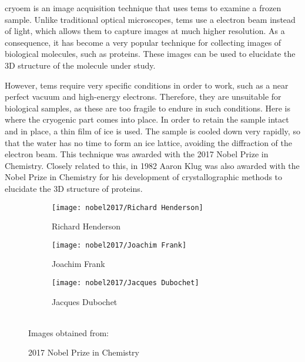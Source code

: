 \documentclass[../main.tex]{subfiles}
\begin{document}
\gls{cryoem} is an image acquisition technique that uses \glspl{tem} to examine a frozen sample. Unlike traditional optical microscopes, \glspl{tem} use a electron beam instead of light, which allows them to capture images at much higher resolution. As a consequence, it has become a very popular technique for collecting images of biological molecules, such as proteins\cite{chemistry_world_cryoem}. These images can be used to elucidate the 3D structure of the molecule under study.

However, \glspl{tem} require very specific conditions in order to work, such as a near perfect vacuum and high-energy electrons. Therefore, they are unsuitable for biological samples, as these are too fragile to endure in such conditions. Here is where the cryogenic part comes into place. In order to retain the sample intact and in place, a thin film of ice is used. The sample is cooled down very rapidly, so that the water has no time to form an ice lattice, avoiding the diffraction of the electron beam. This technique was awarded with the 2017 Nobel Prize in Chemistry\cite{chemistry_world_cryoem}\cite{nobel2017}. Closely related to this, in 1982 Aaron Klug was also awarded with the Nobel Prize in Chemistry for his development of crystallographic methods to elucidate the 3D structure of proteins\cite{nobel1982}.

\begin{figure}[htbp]
    \centering
    \begin{subfigure}[b]{0.3\textwidth}
         \centering
         \texttt{[image: nobel2017/Richard Henderson]}
         \caption{Richard Henderson}
         \label{fig:1:nobel2017:richard}
    \end{subfigure}
    \hfill
    \begin{subfigure}[b]{0.3\textwidth}
         \centering
         \texttt{[image: nobel2017/Joachim Frank]}
         \caption{Joachim Frank}
         \label{fig:1:nobel2017:joachim}
    \end{subfigure}
    \hfill
    \begin{subfigure}[b]{0.3\textwidth}
         \centering
         \texttt{[image: nobel2017/Jacques Dubochet]}
         \caption{Jacques Dubochet}
         \label{fig:1:nobel2017:jaques}
    \end{subfigure}\\
    Images obtained from: \cite{science_nobel}
    \caption{2017 Nobel Prize in Chemistry}
    \label{fig:1:nobel2017}
\end{figure}
\end{document}
